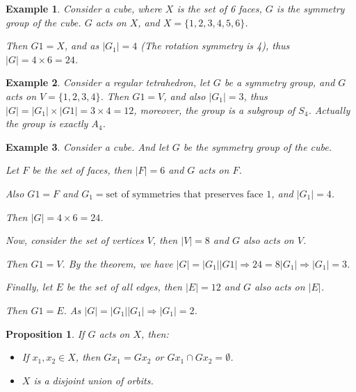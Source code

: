 \documentclass{article}
\theoremstyle{MyNonumberplain}
\theoremstyle{break}
\theoremstyle{break}
\newtheorem{proposition}{Proposition}[section]
\newtheorem{example}{Example}[section]
\theoremstyle{break}
\theoremstyle{definition}
\theoremstyle{break}
\begin{document}
\begin{expbox}
    \begin{example}
        Consider a cube, where $X$ is the set of 6 faces, $G$ is the symmetry group of
the cube. $G$ acts on $X$, and $X = \{ 1, 2, 3, 4, 5, 6 \}$.

Then $G 1 = X$, and as $| G_1 | = 4$ (The rotation symmetry is 4), thus $| G |
= 4 \times 6 = 24$.
    \end{example}
\end{expbox}

\begin{expbox}
    \begin{example}
        Consider a regular tetrahedron, let $G$ be a symmetry group, and $G$ acts on
$V = \{ 1, 2, 3, 4 \}$. Then $G 1 = V$, and also $| G_1 | = 3$, thus $| G | =
| G_1 | \times | G 1 | = 3 \times 4 = 12$, moreover, the group is a subgroup
of $S_4$. Actually the group is exactly $A_4$.
    \end{example}
\end{expbox}

\begin{expbox}
    \begin{example}
        Consider a cube. And let $G$ be the symmetry group of the cube.\bigskip

        Let $F$ be the set of faces, then $| F | = 6$ and $G$ acts on $F$.\bigskip

        Also $G 1 = F$ and $G_1 = \text{set of symmetries that preserves face 1}$,
        and $| G_1 | = 4$.\bigskip

        Then $| G | = 4 \times 6 = 24$.\bigskip

        Now, consider the set of vertices $V$, then $| V | = 8$ and $G$ also acts on
        $V$.\bigskip

        Then $G 1 = V$. By the theorem, we have $| G | = | G_1 |  | G 1 | \Rightarrow
        24 = 8 | G_1 | \Rightarrow | G_1 | = 3$.\bigskip

        Finally, let $E$ be the set of all edges, then $| E | = 12$ and $G$ also acts
        on $| E |$.\bigskip

        Then $G 1 = E$. As $| G | = | G_1 |  | G_1 | \Rightarrow | G_1 | = 2$.
    \end{example}
\end{expbox}

\begin{thmbox}
    \begin{proposition}
        If $G$ acts on $X$, then:\\
        \begin{itemize}
        \item If $x_1, x_2 \in X$, then $G x_1 = G x_2$ or $G x_1 \cap G x_2 =
        \emptyset$.\bigskip
        
        \item $X$ is a disjoint union of orbits.
        \end{itemize}
    \end{proposition}
\end{thmbox}
\end{document}
